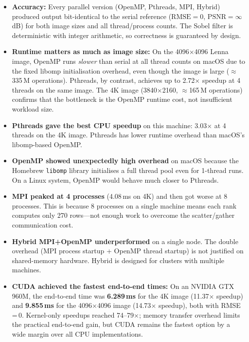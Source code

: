 \documentclass[12pt,a4paper]{article}
\begin{document}
\begin{itemize}
  \item \textbf{Accuracy:} Every parallel version (OpenMP, Pthreads, MPI,
        Hybrid) produced output bit-identical to the serial reference
        ($\mathrm{RMSE} = 0$, $\mathrm{PSNR} = \infty$\,dB) for both image
        sizes and all thread/process counts. The Sobel filter is deterministic
        with integer arithmetic, so correctness is guaranteed by design.

  \item \textbf{Runtime matters as much as image size:} On the 4096$\times$4096
        Lenna image, OpenMP runs \emph{slower} than serial at all thread counts
        on macOS due to the fixed libomp initialisation overhead, even though the
        image is large ($\approx$335\,M operations). Pthreads, by contrast,
        achieves up to 2.72$\times$ speedup at 4 threads on the same image.
        The 4K image (3840$\times$2160, $\approx$165\,M operations) confirms
        that the bottleneck is the OpenMP runtime cost, not insufficient
        workload size.

  \item \textbf{Pthreads gave the best CPU speedup} on this machine:
        3.03$\times$ at 4 threads on the 4K image. Pthreads has lower
        runtime overhead than macOS's libomp-based OpenMP.

  \item \textbf{OpenMP showed unexpectedly high overhead} on macOS because
        the Homebrew \texttt{libomp} library initialises a full thread pool
        even for 1-thread runs. On a Linux system, OpenMP would behave much
        closer to Pthreads.

  \item \textbf{MPI peaked at 4 processes} (4.08\,ms on 4K) and then got
        worse at 8 processes. This is because 8 processes on a single machine
        means each rank computes only 270 rows---not enough work to overcome
        the scatter/gather communication cost.

  \item \textbf{Hybrid MPI+OpenMP underperformed} on a single node. The
        double overhead (MPI process startup + OpenMP thread startup) is not
        justified on shared-memory hardware. Hybrid is designed for clusters
        with multiple machines.

  \item \textbf{CUDA achieved the fastest end-to-end times:} On an NVIDIA
        GTX\,960M, the end-to-end time was \textbf{6.289\,ms} for the 4K image
        (11.37$\times$ speedup) and \textbf{9.855\,ms} for the
        4096$\times$4096 image (14.73$\times$ speedup), both with RMSE\,=\,0.
        Kernel-only speedups reached 74--79$\times$; memory transfer overhead
        limits the practical end-to-end gain, but CUDA remains the fastest
        option by a wide margin over all CPU implementations.
\end{itemize}
\end{document}
